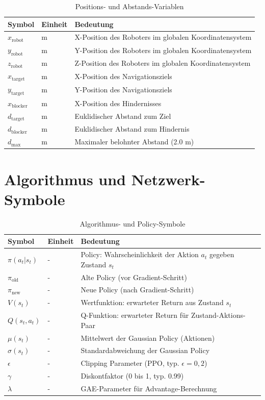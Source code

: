 \begin{table}[htbp]
	\centering
	\begin{tabular}{lll}
		\toprule
		\textbf{Symbol} & \textbf{Einheit} & \textbf{Bedeutung} \\
		\midrule
		$x_{\text{robot}}$ & m & X-Position des Roboters im globalen Koordinatensystem \\
		$y_{\text{robot}}$ & m & Y-Position des Roboters im globalen Koordinatensystem \\
		$z_{\text{robot}}$ & m & Z-Position des Roboters im globalen Koordinatensystem \\
		$x_{\text{target}}$ & m & X-Position des Navigationsziels \\
		$y_{\text{target}}$ & m & Y-Position des Navigationsziels \\
		$x_{\text{blocker}}$ & m & X-Position des Hindernisses \\
		$d_{\text{target}}$ & m & Euklidischer Abstand zum Ziel \\
		$d_{\text{blocker}}$ & m & Euklidischer Abstand zum Hindernis \\
		$d_{\text{max}}$ & m & Maximaler belohnter Abstand (2.0 m) \\
		\bottomrule
	\end{tabular}
	\caption{Positions- und Abstands-Variablen}
	\label{tab:symbols_position}
\end{table}

\section{Algorithmus und Netzwerk-Symbole}

\begin{table}[htbp]
	\centering
	\begin{tabular}{lll}
		\toprule
		\textbf{Symbol} & \textbf{Einheit} & \textbf{Bedeutung} \\
		\midrule
		$\pi(a_t|s_t)$ & - & Policy: Wahrscheinlichkeit der Aktion $a_t$ gegeben Zustand $s_t$ \\
		$\pi_{\text{old}}$ & - & Alte Policy (vor Gradient-Schritt) \\
		$\pi_{\text{new}}$ & - & Neue Policy (nach Gradient-Schritt) \\
		$V(s_t)$ & - & Wertfunktion: erwarteter Return aus Zustand $s_t$ \\
		$Q(s_t, a_t)$ & - & Q-Funktion: erwarteter Return für Zustand-Aktions-Paar \\
		$\mu(s_t)$ & - & Mittelwert der Gaussian Policy (Aktionen) \\
		$\sigma(s_t)$ & - & Standardabweichung der Gaussian Policy \\
		$\epsilon$ & - & Clipping Parameter (PPO, typ. $\epsilon = 0,2$) \\
		$\gamma$ & - & Diskontfaktor (0 bis 1, typ. 0.99) \\
		$\lambda$ & - & GAE-Parameter für Advantage-Berechnung \\
		\bottomrule
	\end{tabular}
	\caption{Algorithmus- und Policy-Symbole}
	\label{tab:symbols_algorithm}
\end{table}

